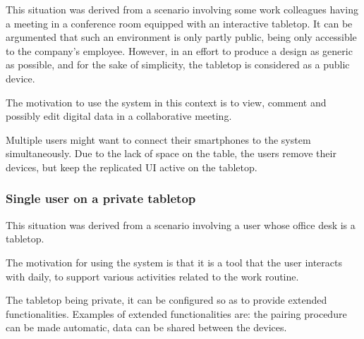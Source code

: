 This situation was derived from a scenario involving some work colleagues having a meeting in a conference room equipped with an interactive tabletop.
It can be argumented that such an environment is only partly public, being only accessible to the company's employee.
However, in an effort to produce a design as generic as possible, and for the sake of simplicity, the tabletop is considered as a public device.

The motivation to use the system in this context is to view, comment and possibly edit digital data in a collaborative meeting.

Multiple users might want to connect their smartphones to the system simultaneously.
Due to the lack of space on the table, the users remove their devices, but keep the replicated UI active on the tabletop.


\subsubsection{Single user on a private tabletop}

This situation was derived from a scenario involving a user whose office desk is a tabletop.

The motivation for using the system is that it is a tool that the user interacts with daily, to support various activities related to the work routine.

The tabletop being private, it can be configured so as to provide extended functionalities.
Examples of extended functionalities are: the pairing procedure can be made automatic, data can be shared between the devices.


